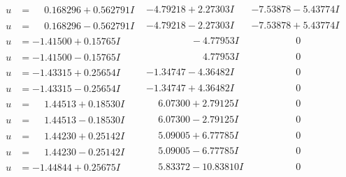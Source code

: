 \documentclass[1p]{elsarticle_modified}
\theoremstyle{definition}
\begin{document}
$$\begin{array}{c|c|c}
\begin{aligned}
u &= \phantom{-}0.168296 + 0.562791 I\end{aligned}
 & -4.79218 + 2.27303 I & -7.53878 - 5.43774 I \\ \hline\begin{aligned}
u &= \phantom{-}0.168296 - 0.562791 I\end{aligned}
 & -4.79218 - 2.27303 I & -7.53878 + 5.43774 I \\ \hline\begin{aligned}
u &= -1.41500 + 0.15765 I\end{aligned}
 & \phantom{-0.000000 } -4.77953 I & \phantom{-0.000000 } 0 \\ \hline\begin{aligned}
u &= -1.41500 - 0.15765 I\end{aligned}
 & \phantom{-0.000000 -}4.77953 I & \phantom{-0.000000 } 0 \\ \hline\begin{aligned}
u &= -1.43315 + 0.25654 I\end{aligned}
 & -1.34747 - 4.36482 I & \phantom{-0.000000 } 0 \\ \hline\begin{aligned}
u &= -1.43315 - 0.25654 I\end{aligned}
 & -1.34747 + 4.36482 I & \phantom{-0.000000 } 0 \\ \hline\begin{aligned}
u &= \phantom{-}1.44513 + 0.18530 I\end{aligned}
 & \phantom{-}6.07300 + 2.79125 I & \phantom{-0.000000 } 0 \\ \hline\begin{aligned}
u &= \phantom{-}1.44513 - 0.18530 I\end{aligned}
 & \phantom{-}6.07300 - 2.79125 I & \phantom{-0.000000 } 0 \\ \hline\begin{aligned}
u &= \phantom{-}1.44230 + 0.25142 I\end{aligned}
 & \phantom{-}5.09005 + 6.77785 I & \phantom{-0.000000 } 0 \\ \hline\begin{aligned}
u &= \phantom{-}1.44230 - 0.25142 I\end{aligned}
 & \phantom{-}5.09005 - 6.77785 I & \phantom{-0.000000 } 0 \\ \hline\begin{aligned}
u &= -1.44844 + 0.25675 I\end{aligned}
 & \phantom{-}5.83372 - 10.83810 I & \phantom{-0.000000 } 0 \\ \hline\begin{aligned}

\end{aligned}
\end{array}$$
\end{document}
